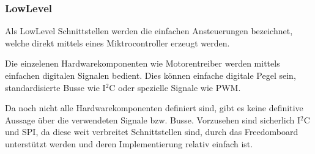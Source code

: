 \subsubsection{LowLevel}
Als LowLevel Schnittstellen werden die einfachen Ansteuerungen
bezeichnet, welche direkt mittels eines Miktrocontroller erzeugt
werden.

Die einzelenen Hardwarekomponenten wie Motorentreiber werden mittels
einfachen digitalen Signalen bedient. Dies können einfache digitale
Pegel sein, standardisierte Busse wie I$^2$C oder spezielle Signale
wie PWM. 

Da noch nicht alle Hardwarekomponenten definiert sind, gibt es keine
definitive Aussage über die verwendeten Signale bzw. Busse. Vorzusehen
sind sicherlich I$^2$C und SPI, da diese weit verbreitet Schnittstellen
sind, durch das Freedomboard unterstützt werden und deren
Implementierung relativ einfach ist.
